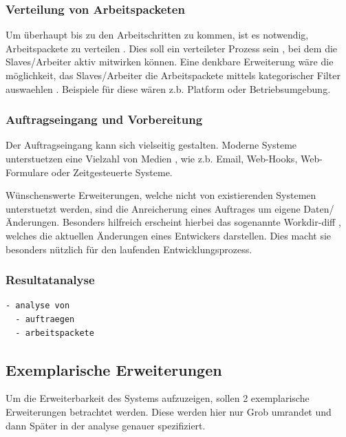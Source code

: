 \subsubsection{Verteilung von Arbeitspacketen}

Um \"uberhaupt bis zu den Arbeitschritten zu kommen,
ist es notwendig, Arbeitspackete zu verteilen .
Dies soll ein verteileter Prozess sein ,
bei dem die Slaves/Arbeiter aktiv mitwirken k\"onnen.
Eine denkbare Erweiterung w\"are die m\"oglichkeit, das Slaves/Arbeiter
die Arbeitspackete mittels kategorischer Filter auswaehlen .
Beispiele f\"ur diese w\"aren z.b. Platform oder Betriebsumgebung.

\subsubsection{Auftragseingang und Vorbereitung}


Der Auftragseingang kann sich vielseitig gestalten.
Moderne Systeme unterstuetzen eine Vielzahl von Medien ,
wie z.b. Email, Web-Hooks, Web-Formulare oder Zeitgesteuerte Systeme.

W\"unschenswerte Erweiterungen, welche nicht von existierenden Systemen unterstuetzt werden,
sind die Anreicherung eines Auftrages um eigene Daten/\"Anderungen.
Besonders hilfreich erscheint hierbei das sogenannte Workdir-diff ,
welches die aktuellen \"Anderungen eines Entwickers darstellen.
Dies macht sie besonders n\"utzlich f\"ur den laufenden Entwicklungsprozess.

\subsubsection{Resultatanalyse}


\begin{verbatim}
- analyse von
  - auftraegen
  - arbeitspackete
\end{verbatim}



\subsection{Exemplarische Erweiterungen}

Um die Erweiterbarkeit des Systems aufzuzeigen,
sollen 2 exemplarische Erweiterungen betrachtet werden.
Diese werden hier nur Grob umrandet und dann Sp\"ater in der analyse genauer spezifiziert.

